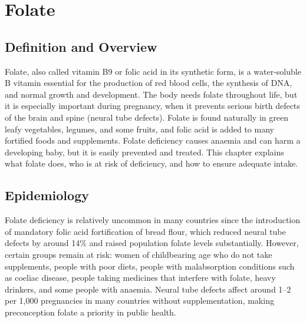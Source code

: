 \chapter{Folate}

\section*{Definition and Overview}
Folate, also called vitamin B9 or folic acid in its synthetic form, is a water-soluble B vitamin essential for the production of red blood cells, the synthesis of DNA, and normal growth and development. The body needs folate throughout life, but it is especially important during pregnancy, when it prevents serious birth defects of the brain and spine (neural tube defects). Folate is found naturally in green leafy vegetables, legumes, and some fruits, and folic acid is added to many fortified foods and supplements. Folate deficiency causes anaemia and can harm a developing baby, but it is easily prevented and treated. This chapter explains what folate does, who is at risk of deficiency, and how to ensure adequate intake.

\section*{Epidemiology}
Folate deficiency is relatively uncommon in many countries since the introduction of mandatory folic acid fortification of bread flour, which reduced neural tube defects by around 14\% and raised population folate levels substantially. However, certain groups remain at risk: women of childbearing age who do not take supplements, people with poor diets, people with malabsorption conditions such as coeliac disease, people taking medicines that interfere with folate, heavy drinkers, and some people with anaemia. Neural tube defects affect around 1--2 per 1,000 pregnancies in many countries without supplementation, making preconception folate a priority in public health.

